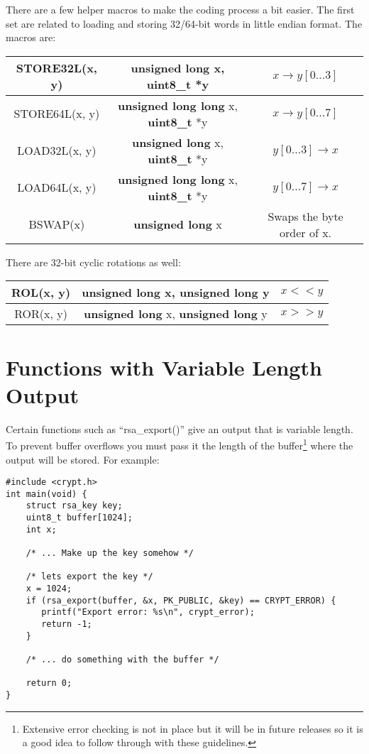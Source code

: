 \documentclass{book}
\begin{document}
There are a few helper macros to make the coding process a bit easier.  The first set are related to loading and storing
32/64-bit words in little endian format.  The macros are:

\begin{center}
\begin{tabular}{|c|c|c|}
     \hline STORE32L(x, y) & {\bf unsigned long} x, {\bf uint8_t} *y & $x \to y[0 \ldots 3]$ \\
     \hline STORE64L(x, y) & {\bf unsigned long long} x, {\bf uint8_t} *y & $x \to y[0 \ldots 7]$ \\
     \hline LOAD32L(x, y) & {\bf unsigned long} x, {\bf uint8_t} *y & $y[0 \ldots 3] \to x$ \\
     \hline LOAD64L(x, y) & {\bf unsigned long long} x, {\bf uint8_t} *y & $y[0 \ldots 7] \to x$ \\
     \hline BSWAP(x) & {\bf unsigned long} x & Swaps the byte order of x. \\
     \hline
\end{tabular}
\end{center}

There are 32-bit cyclic rotations as well:
\begin{center}
\begin{tabular}{|c|c|c|}
     \hline ROL(x, y) & {\bf unsigned long} x, {\bf unsigned long} y & $x << y$ \\
     \hline ROR(x, y) & {\bf unsigned long} x, {\bf unsigned long} y & $x >> y$ \\
     \hline
\end{tabular}
\end{center}

\section{Functions with Variable Length Output}
Certain functions such as ``rsa\_export()'' give an output that is variable length.  To prevent buffer overflows you
must pass it the length of the buffer\footnote{Extensive error checking is not in place but it will be in future releases so it is a good idea to follow through with these guidelines.} where
the output will be stored.  For example:

\begin{verbatim}
#include <crypt.h>
int main(void) {
    struct rsa_key key;
    uint8_t buffer[1024];
    int x;

    /* ... Make up the key somehow */

    /* lets export the key */ 
    x = 1024; 
    if (rsa_export(buffer, &x, PK_PUBLIC, &key) == CRYPT_ERROR) {
       printf("Export error: %s\n", crypt_error);
       return -1;
    }

    /* ... do something with the buffer */
    
    return 0;
}
\end{verbatim}
\end{document}
